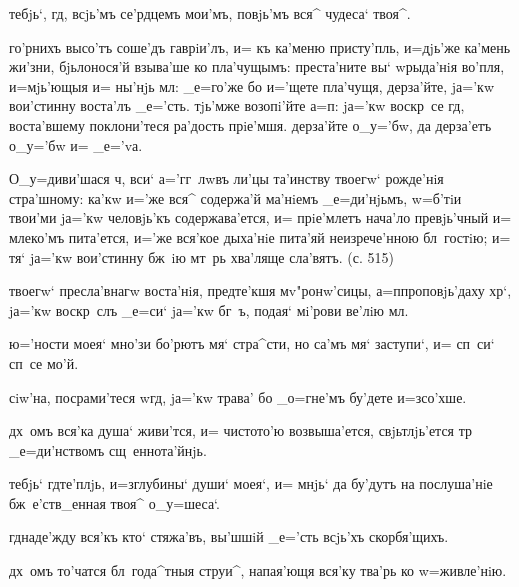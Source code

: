   тебjь`, гд, всjь'мъ 
се'рдцемъ мои'мъ, повjь'мъ вся^ чудеса` твоя^.

 го'рнихъ высо'тъ соше'дъ гаврiи'лъ, и= къ 
ка'меню присту'пль, и=дjь'же ка'мень жи'зни, бjьлонося'й 
взыва'ше ко пла'чущымъ: преста'ните вы` w\т рыда'нiя 
во'пля, и=мjь'ющыя и= ны'нjь мл: _е=го'же бо 
и='щете пла'чущя, дерза'йте, jа='кw вои'стинну воста'лъ 
_е='сть. тjь'мже возопi'йте а=п: jа='кw воскр~се 
гд, воста'вшему поклони'теся ра'дость прiе'мшя. 
дерза'йте о_у='бw, да дерза'етъ о_у='бw и= _е='vа.

 О_у=диви'шася 
ч, вси` а='гг~лwвъ ли'цы та'инству твоегw` рожде'нiя 
стра'шному: ка'кw и='же вся^ содержа'й ма'нiемъ 
_е=ди'нjьмъ, w=б'тiи твои'ми jа='кw человjь'къ 
содержава'ется, и= прiе'млетъ нача'ло превjь'чный и= 
млеко'мъ пита'ется, и='же вся'кое дыха'нiе пита'яй 
неизрече'нною бл~гостiю; и= тя` jа='кw вои'стинну бж~iю 
мт~рь хва'ляще сла'вятъ. (с. 515)


 твоегw` пресла'внагw воста'нiя, предте'кшя 
мv"ронw'сицы, а=п проповjь'даху хр`, jа='кw 
воскр~слъ _е=си` jа='кw бг~ъ, подая` мi'рови ве'лiю 
мл.


 ю='ности моея` мно'зи бо'рютъ мя` стра^сти, но 
са'мъ мя` заступи`, и= сп~си` сп~се мо'й.

 сiw'на, посрами'теся w\т гд, 
jа='кw трава' бо _о=гне'мъ бу'дете и=зсо'хше.

  дх~омъ вся'ка душа` живи'тся, и= 
чистото'ю возвыша'ется, свjьтлjь'ется тр 
_е=ди'нствомъ сщ~еннота'йнjь.



 тебjь` гд те'плjь, и=з\ъ глубины` 
души` моея`, и= мнjь` да бу'дутъ на послуша'нiе 
бж~е'ств_енная твоя^ о_у=шеса`.

 гд наде'жду вся'къ кто` стяжа'въ, вы'шшiй 
_е='сть всjь'хъ скорбя'щихъ.

  дх~омъ то'чатся бл~года^тныя 
струи^, напая'ющя вся'ку тва'рь ко w=живле'нiю.

